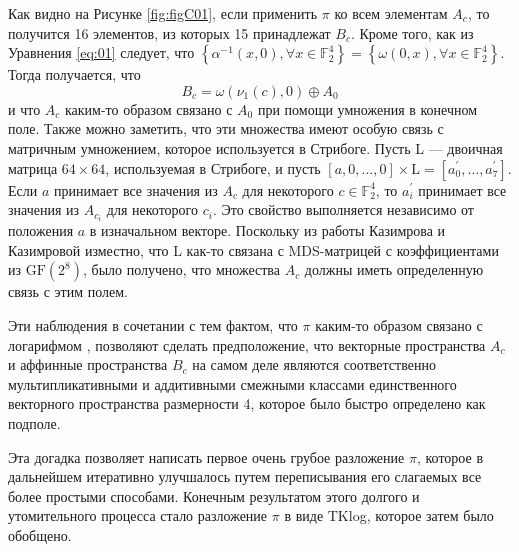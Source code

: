 Как видно на Рисунке \ref{fig:figC01}, если применить $\pi$ ко всем элементам $A_{c}$, то получится 16 элементов, из которых 15 принадлежат $B_{c}$. Кроме того, как из Уравнения \ref{eq:01} следует, что $\left\{\alpha^{-1}(x, 0), \forall x \in \mathbb{F}_{2}^{4}\right\}=\left\{\omega(0, x), \forall x \in \mathbb{F}_{2}^{4}\right\}$. Тогда получается, что
$$
B_{c}=\omega\left(\nu_{1}(c), 0\right) \oplus A_{0}
$$
и что $A_{c}$ каким-то образом связано с $A_{0}$ при помощи умножения в конечном поле. Также можно заметить, что эти множества имеют особую связь с матричным умножением, которое используется в Стрибоге. Пусть L — двоичная матрица $64 \times 64$, используемая в Стрибоге, и пусть $[a, 0, \ldots, 0] \times \mathrm{L}=\left[a_{0}^{\prime}, \ldots, a_{7}^{\prime}\right]$. Если $a$ принимает все значения из $A_{c}$ для некоторого $c \in \mathbb{F}_{2}^{4}$, то $a_{i}^{\prime}$ принимает все значения из $A_{c_{i}}$ для некоторого $c_{i}$. Это свойство выполняется независимо от положения $a$ в изначальном векторе. Поскольку из работы Казимрова и Казимровой \cite{KK13} изместно, что L как-то связана с MDS-матрицей с коэффициентами из $\mathrm{GF}\left(2^{8}\right)$, было получено, что множества $A_{c}$ должны иметь определенную связь с этим полем.

Эти наблюдения в сочетании с тем фактом, что $\pi$ каким-то образом связано с логарифмом \cite{PU16}, позволяют сделать предположение, что векторные пространства $A_{c}$ и аффинные пространства $B_{c}$ на самом деле являются соответственно мультипликативными и аддитивными смежными классами единственного векторного пространства размерности 4, которое было быстро определено как подполе.

Эта догадка позволяет написать первое очень грубое разложение $\pi$, которое в дальнейшем итеративно улучшалось путем переписывания его слагаемых все более простыми способами. Конечным результатом этого долгого и утомительного процесса стало разложение $\pi$ в виде TKlog, которое затем было обобщено.